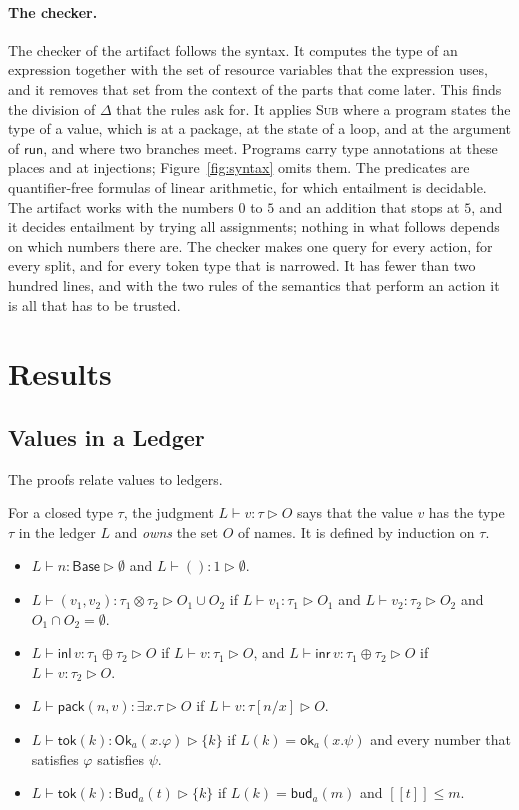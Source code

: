 \documentclass[acmsmall,nonacm,screen]{acmart}
\newcommand{\kw}[1]{\mathsf{#1}}
\newcommand{\Base}{\kw{Base}}
\newcommand{\Ok}[2]{\kw{Ok}_{#1}(#2)}
\newcommand{\Bud}[2]{\kw{Bud}_{#1}(#2)}
\newcommand{\ok}[2]{\kw{ok}_{#1}(#2)}
\newcommand{\bud}[2]{\kw{bud}_{#1}(#2)}
\newcommand{\pack}[2]{\kw{pack}(#1, #2)}
\newcommand{\inl}{\kw{inl}\,}
\newcommand{\inr}{\kw{inr}\,}
\newcommand{\tok}[1]{\kw{tok}(#1)}
\newcommand{\sem}[1]{[\![#1]\!]}
\newcommand{\own}{\mathrel{\triangleright}}
\begin{document}
\paragraph{The checker.} The checker of the artifact follows the syntax. It computes the type
of an expression together with the set of resource variables that the expression uses, and it
removes that set from the context of the parts that come later. This finds the division of
$\Delta$ that the rules ask for. It applies \textsc{Sub} where a program states the type of a
value, which is at a package, at the state of a loop, and at the argument of $\kw{run}$, and
where two branches meet. Programs carry type annotations at these places and at injections;
Figure~\ref{fig:syntax} omits them. The predicates are
quantifier-free formulas of linear arithmetic, for which entailment is decidable. The artifact
works with the numbers $0$ to $5$ and an addition that stops at $5$, and it decides entailment
by trying all assignments; nothing in what follows depends on which numbers there are. The
checker makes one query for every action, for every split, and for every token type that is
narrowed. It has fewer than two hundred lines, and with the two rules of the semantics that
perform an action it is all that has to be trusted.

\section{Results}
\label{sec:results}

\subsection{Values in a Ledger}

The proofs relate values to ledgers.

\begin{definition}
\label{def:values}
For a closed type $\tau$, the judgment $L \vdash v : \tau \own O$ says that the value $v$ has
the type $\tau$ in the ledger $L$ and \emph{owns} the set $O$ of names. It is defined by
induction on $\tau$.
\begin{itemize}
\item $L \vdash n : \Base \own \emptyset$ and $L \vdash () : 1 \own \emptyset$.
\item $L \vdash (v_1, v_2) : \tau_1 \otimes \tau_2 \own O_1 \cup O_2$ if
  $L \vdash v_1 : \tau_1 \own O_1$ and $L \vdash v_2 : \tau_2 \own O_2$ and
  $O_1 \cap O_2 = \emptyset$.
\item $L \vdash \inl v : \tau_1 \oplus \tau_2 \own O$ if $L \vdash v : \tau_1 \own O$, and
  $L \vdash \inr v : \tau_1 \oplus \tau_2 \own O$ if $L \vdash v : \tau_2 \own O$.
\item $L \vdash \pack{n}{v} : \exists x.\tau \own O$ if $L \vdash v : \tau[n/x] \own O$.
\item $L \vdash \tok{k} : \Ok{a}{x.\varphi} \own \{k\}$ if $L(k) = \ok{a}{x.\psi}$ and every
  number that satisfies $\varphi$ satisfies $\psi$.
\item $L \vdash \tok{k} : \Bud{a}{t} \own \{k\}$ if $L(k) = \bud{a}{m}$ and $\sem{t} \le m$.
\end{itemize}
\end{definition}
\end{document}
